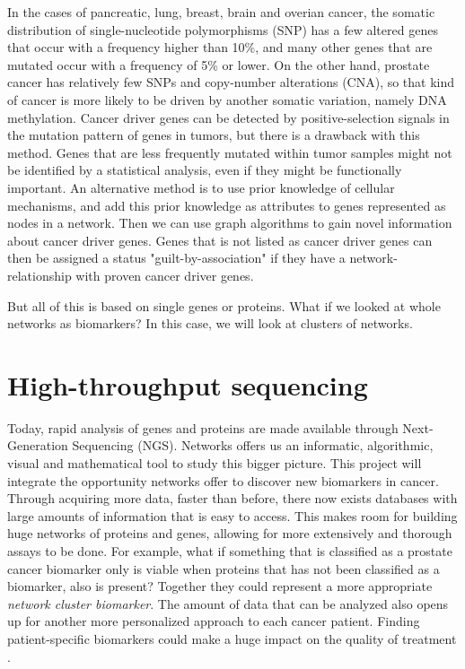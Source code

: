 In the cases of pancreatic, lung, breast, brain and overian cancer, the somatic
distribution of single-nucleotide polymorphisms (SNP) has a few altered genes
that occur with a frequency higher than 10\%, and many other genes that are
mutated occur with a frequency of 5\% or lower\cite{pathway-network}. On the
other hand, prostate cancer has relatively few SNPs and copy-number alterations
(CNA), so that kind of cancer is more likely to be driven by another somatic
variation, namely DNA methylation. Cancer driver genes can be detected by
positive-selection signals in the mutation pattern of genes in tumors, but there
is a drawback with this method. Genes that are less frequently mutated within
tumor samples might not be identified by a statistical analysis, even if they
might be functionally important. An alternative method is to use prior knowledge
of cellular mechanisms, and add this prior knowledge as attributes to genes
represented as nodes in a network. Then we can use graph algorithms to gain
novel information about cancer driver genes. Genes that is not listed as cancer
driver genes can then be assigned a status "guilt-by-association" if they have a
network-relationship with proven cancer driver genes.

But all of this is based on single genes or proteins. What if we looked at whole
networks as biomarkers? In this case, we will look at clusters of networks.

\section{High-throughput sequencing}
Today, rapid analysis of genes and proteins are made available through
Next-Generation Sequencing (NGS)\cite{ngs1}. Networks offers us an informatic,
algorithmic, visual and mathematical tool to study this bigger picture. This
project will integrate the opportunity networks offer to discover new biomarkers
in cancer. Through acquiring more data, faster than before, there now exists
databases with large amounts of information that is easy to access. This makes
room for building huge networks of proteins and genes, allowing for more
extensively and thorough assays to be done. For example, what if something that
is classified as a prostate cancer biomarker only is viable when proteins that
has not been classified as a biomarker, also is present?  Together they could
represent a more appropriate \emph{network cluster biomarker}. The amount of
data that can be analyzed also opens up for another more personalized approach
to each cancer patient. Finding patient-specific biomarkers could make a huge
impact on the quality of treatment \cite{personalized}.  


